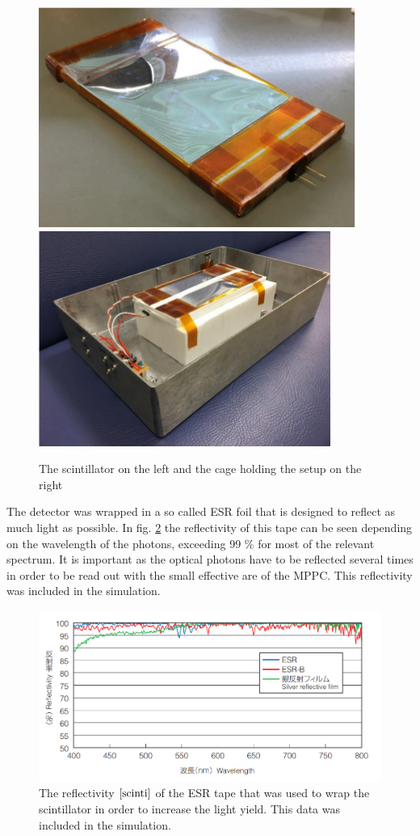 \documentclass[12pt, a4paper,titlepage]{article}
\numberwithin{equation}{section}
\numberwithin{figure}{section}
\begin{document}
\begin{figure}[htbp]
 \centering %
 \includegraphics[width=.4\textwidth,origin=c,angle=0]{images/1channelsetup.png}
 \qquad
 \includegraphics[width=.4\textwidth,origin=c,angle=0]{images/1channelsetupbox.png} 
 \caption{\label{fig:i} The scintillator on the left and the cage holding the setup on the right \cite{kento}}
 \end{figure}

The detector was wrapped in a so called ESR foil that is designed to reflect as much light as possible. In fig. \ref{fig:refl} the reflectivity of this tape can be seen depending on the wavelength of the photons, exceeding 99 \% for most of the relevant spectrum. It is important as the optical photons have to be reflected several times in order to be read out with the small effective are of the MPPC. This reflectivity was included in the simulation.


\begin{figure}[H]
\centering
\includegraphics[width=130.0mm]{images/reflectivity.png}
\caption{The reflectivity $\cite{scinti}$ of the ESR tape that was used to wrap the scintillator in order to increase the light yield. This data was included in the simulation.}
\label{fig:refl}
\end{figure}
\end{document}
